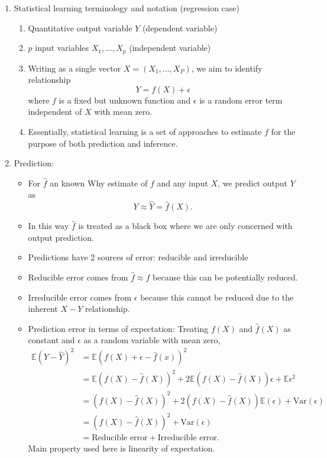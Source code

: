 \documentclass{article}
\begin{document}
\begin{enumerate}

\item Statistical learning terminology and notation (regression case)
\begin{enumerate}
\item Quantitative output variable $Y$ (dependent variable)
\item $p$ input variables $X_1, \dots, X_p$ (independent variable)
\item Writing as a single vector $X = (X_1, \dots, X_P)$, we aim to identify relationship
\[
Y = f(X) + \epsilon
\]
where $f$ is a fixed but unknown function and $\epsilon$ is a random error term independent of $X$ with mean zero.
\item Essentially, statistical learning is a set of approaches to estimate $f$ for the purpose of both prediction and inference.
\end{enumerate}

\item Prediction:
\begin{itemize}
\item For $\hat{f}$ an known Why estimate of $f$ and any input $X$, we predict output $Y$ as
\[
Y \approx \hat{Y} = \hat{f}(X).
\]
\item In this way $\hat{f}$ is treated as a black box where we are only concerned with output prediction.
\item Predictions have 2 sources of error: reducible and irreducible
\item Reducible error comes from $\hat{f} \approx f$ because this can be potentially reduced.
\item Irreducible error comes from $\epsilon$ because this cannot be reduced due to the inherent $X-Y$ relationship.
\item Prediction error in terms of expectation: Treating $f(X)$ and $\hat{f}(X)$ as constant and $\epsilon$ as a random variable with mean zero,
\begin{align*}
\mathbb{E}(Y-\hat{Y})^2 &= \mathbb{E}(f(X)+\epsilon-\hat{f}(x))^2 \\ 
&= \mathbb{E}(f(X)-\hat{f}(X))^2 +  2\mathbb{E}(f(X)-\hat{f}(X))\epsilon + \mathbb{E}\epsilon^2\\  
&= (f(X)-\hat{f}(X))^2 +  2(f(X)-\hat{f}(X)) \mathbb{E}(\epsilon) + \mathrm{Var}(\epsilon)\\  
&= (f(X)-\hat{f}(X))^2 + \mathrm{Var}(\epsilon)\\  
&= \text{Reducible error} + \text{Irreducible error}.
\end{align*}
Main property used here is linearity of expectation.
\end{itemize}


\end{enumerate}
\end{document}
